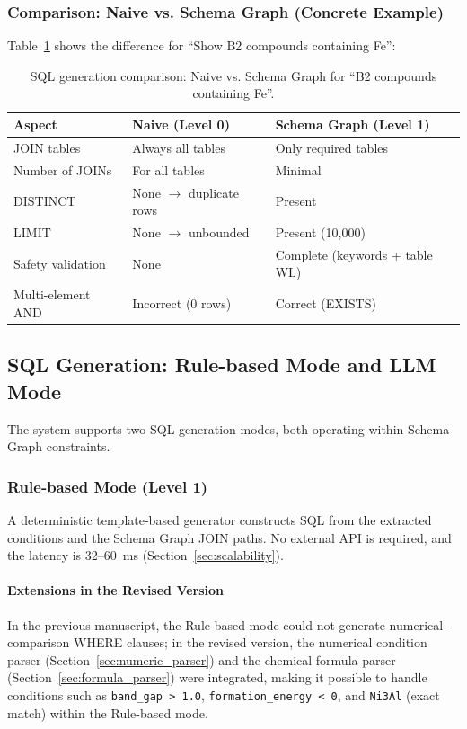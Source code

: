 \documentclass[5p,twocolumn]{elsarticle}
\begin{document}
\subsubsection{Comparison: Naive vs. Schema Graph (Concrete Example)}

Table~\ref{tab:naive_vs_sg} shows the difference for ``Show B2 compounds containing Fe'':

\begin{table}[htbp]
  \centering
  \caption{SQL generation comparison: Naive vs. Schema Graph for ``B2 compounds containing Fe''.}
  \label{tab:naive_vs_sg}
  \small
  \begin{tabularx}{\linewidth}{lXX}
    \toprule
    Aspect & Naive (Level 0) & Schema Graph (Level 1) \\
    \midrule
    JOIN tables & Always all tables & Only required tables \\
    Number of JOINs & For all tables & Minimal \\
    DISTINCT & None $\to$ duplicate rows & Present \\
    LIMIT & None $\to$ unbounded & Present (10{,}000) \\
    Safety validation & None & Complete (keywords + table WL) \\
    Multi-element AND & Incorrect (0 rows) & Correct (EXISTS) \\
    \bottomrule
  \end{tabularx}
\end{table}
\subsection{SQL Generation: Rule-based Mode and LLM Mode}
\label{sec:sql_generation}

The system supports two SQL generation modes,
both operating within Schema Graph constraints.

\subsubsection{Rule-based Mode (Level 1)}

A deterministic template-based generator constructs SQL from the extracted conditions and
the Schema Graph JOIN paths.
No external API is required, and the latency is 32--60~ms (Section~\ref{sec:scalability}).

\paragraph{Extensions in the Revised Version}
In the previous manuscript, the Rule-based mode could not generate numerical-comparison WHERE clauses;
in the revised version, the numerical condition parser (Section~\ref{sec:numeric_parser}) and
the chemical formula parser (Section~\ref{sec:formula_parser}) were integrated,
making it possible to handle conditions such as
\texttt{band\_gap > 1.0}, \texttt{formation\_energy < 0}, and
\texttt{Ni3Al} (exact match) within the Rule-based mode.
\end{document}

